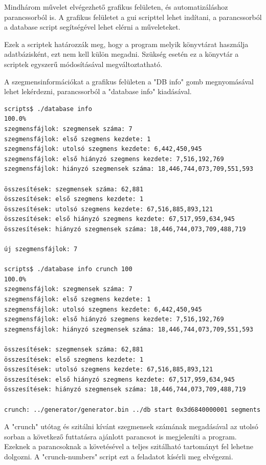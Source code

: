 \documentclass[12pt]{report}
\begin{document}
Mindhárom művelet elvégezhető grafikus felületen, és automatizáláshoz parancssorból is.
A grafikus felületet a gui scripttel lehet indítani, a parancssorból
a database script segítségével lehet elérni a műveleteket.

Ezek a scriptek határozzák meg, hogy a program melyik könyvtárat használja
adatbázisként, ezt nem kell külön megadni.
Szükség esetén ez a könyvtár a scriptek egyszerű módosításával
megváltoztatható.

A szegmensinformációkat a grafikus felületen a "DB info" gomb megnyomásával lehet
lekérdezni, parancssorból a "database info" kiadásával.

{\tiny
\begin{lstlisting}[language=bash]
scripts$ ./database info
100.0%
szegmensfájlok: szegmensek száma: 7
szegmensfájlok: első szegmens kezdete: 1
szegmensfájlok: utolsó szegmens kezdete: 6,442,450,945
szegmensfájlok: első hiányzó szegmens kezdete: 7,516,192,769
szegmensfájlok: hiányzó szegmensek száma: 18,446,744,073,709,551,593

összesítések: szegmensek száma: 62,881
összesítések: első szegmens kezdete: 1
összesítések: utolsó szegmens kezdete: 67,516,885,893,121
összesítések: első hiányzó szegmens kezdete: 67,517,959,634,945
összesítések: hiányzó szegmensek száma: 18,446,744,073,709,488,719

új szegmensfájlok: 7

scripts$ ./database info crunch 100
100.0%
szegmensfájlok: szegmensek száma: 7
szegmensfájlok: első szegmens kezdete: 1
szegmensfájlok: utolsó szegmens kezdete: 6,442,450,945
szegmensfájlok: első hiányzó szegmens kezdete: 7,516,192,769
szegmensfájlok: hiányzó szegmensek száma: 18,446,744,073,709,551,593

összesítések: szegmensek száma: 62,881
összesítések: első szegmens kezdete: 1
összesítések: utolsó szegmens kezdete: 67,516,885,893,121
összesítések: első hiányzó szegmens kezdete: 67,517,959,634,945
összesítések: hiányzó szegmensek száma: 18,446,744,073,709,488,719

crunch: ../generator/generator.bin ../db start 0x3d6840000001 segments 0x64
\end{lstlisting}
}

A "crunch" utótag és szitálni kívánt szegmensek számának megadásával az utolsó sorban
a következő futtatásra ajánlott parancsot is megjeleníti a program.
Ezeknek a parancsoknak a követésével a teljes szitálható tartományt fel lehetne dolgozni.
A "crunch-numbers" script ezt a feladatot kísérli meg elvégezni.
\end{document}
